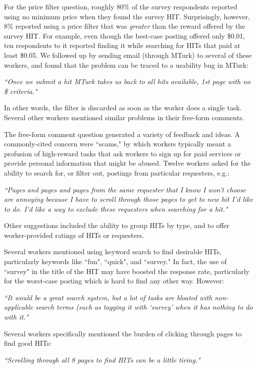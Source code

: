 \documentclass{acm_proc_article-sp}
\begin{document}
For the price filter question, roughly 80\% of the survey respondents
reported using no minimum price when they found the survey HIT.
Surprisingly, however, 8\% reported using a price filter that was {\em
  greater} than the reward offered by the survey HIT.  For example,
even though the best-case posting offered only \$0.01, ten respondents
to it reported finding it while searching for HITs that paid at least
\$0.05.  We followed up by sending email (through MTurk) to several of
these workers, and found that the problem can be traced to a usability
bug in MTurk:

{\em ``Once we submit a hit MTurk takes us back to all hits available,
1st page with no \$ criteria."
}

In other words, the filter is discarded as soon as the worker does a single task.  Several other workers mentioned similar problems in their free-form comments.

The free-form comment question generated a variety of feedback and ideas.  A commonly-cited concern were ``scams," by which workers typically meant a profusion of high-reward tasks that ask workers to sign up for paid services or provide personal information that might be abused.  Twelve workers asked for the ability to search for, or filter out, postings from particular requesters, e.g.:

{\em ``Pages and pages and pages from the same requester that I know I won't choose are annoying because I have to scroll through those pages to get to new hit I'd like to do.  I'd like a way to exclude these requesters when searching for a hit."
}

Other suggestions included the ability to group HITs by type, and to offer worker-provided ratings of HITs or requesters.

Several workers mentioned using keyword search to find desirable HITs, particularly keywords like ``fun", ``quick", and ``survey." In fact, the use of ``survey" in the title of the HIT may have boosted the response rate, particularly for the worst-case posting which is hard to find any other way. However:

{\em ``It would be a great search system, but a lot of tasks are bloated with non-applicable search terms (such as tagging it with `survey' when it has nothing to do with it."
}

Several workers specifically mentioned the burden of clicking through pages to find good HITs:

{\em ``Scrolling through all 8 pages to find HITs can be a little tiring."}
\end{document}
